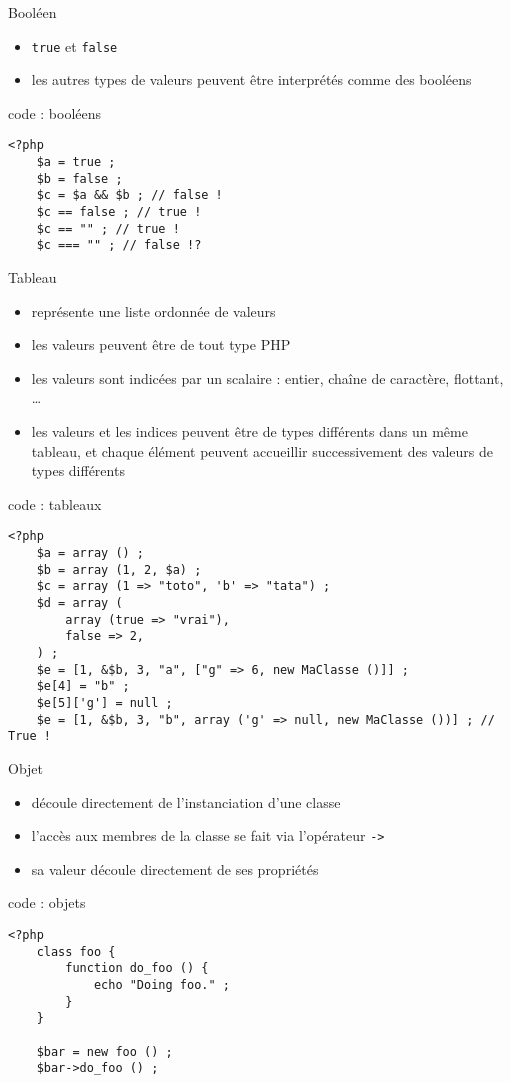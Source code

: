 \begin{frame}[containsverbatim]{Booléen}
	\begin{itemize}
		\item \texttt{true} et \texttt{false}
		\item les autres types de valeurs peuvent être interprétés comme des booléens
	\end{itemize}
	\begin{block}{code : booléens}
		\begin{lstlisting}
<?php
	$a = true ;
	$b = false ;
	$c = $a && $b ; // false !
	$c == false ; // true !
	$c == "" ; // true !
	$c === "" ; // false !?
		\end{lstlisting}
	\end{block}
\end{frame}

\begin{frame}[containsverbatim]{Tableau}
	\begin{itemize}
		\item représente une liste ordonnée de valeurs
		\item les valeurs peuvent être de tout type PHP
		\item les valeurs sont indicées par un scalaire : entier, chaîne de caractère, flottant, \ldots
		\item les valeurs et les indices peuvent être de types différents dans un même tableau, et chaque élément peuvent accueillir successivement des valeurs de types différents
	\end{itemize}
	\begin{block}{code : tableaux}
		\begin{lstlisting}
<?php
	$a = array () ;
	$b = array (1, 2, $a) ;
	$c = array (1 => "toto", 'b' => "tata") ;
	$d = array (
		array (true => "vrai"),
		false => 2,
	) ;
	$e = [1, &$b, 3, "a", ["g" => 6, new MaClasse ()]] ;
	$e[4] = "b" ;
	$e[5]['g'] = null ;
	$e = [1, &$b, 3, "b", array ('g' => null, new MaClasse ())] ; // True !
		\end{lstlisting}
	\end{block}
\end{frame}

\begin{frame}[containsverbatim]{Objet}
	\begin{itemize}
		\item découle directement de l'instanciation d'une classe
		\item l'accès aux membres de la classe se fait via l'opérateur \texttt{->}
		\item sa valeur découle directement de ses propriétés 
	\end{itemize}
	\begin{block}{code : objets}
		\begin{lstlisting}
<?php
	class foo {
		function do_foo () {
			echo "Doing foo." ;
		}
	}

	$bar = new foo () ;
	$bar->do_foo () ;
		\end{lstlisting}
	\end{block}
\end{frame}

